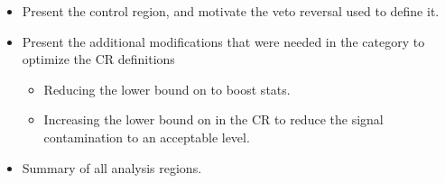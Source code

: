 \begin{itemize}
\begin{itemize}
\item Present the \ttbar control region, and motivate the \bjet veto reversal used to define it.
\item Present the additional modifications that were needed in the \merged category to optimize the CR definitions
\begin{itemize}
\item Reducing the lower bound on \metsig to boost stats.
\item Increasing the lower bound on \dR in the \wjets CR to reduce the signal contamination to an acceptable level.
\end{itemize}
\item Summary of all analysis regions.
\end{itemize}
\end{itemize}
